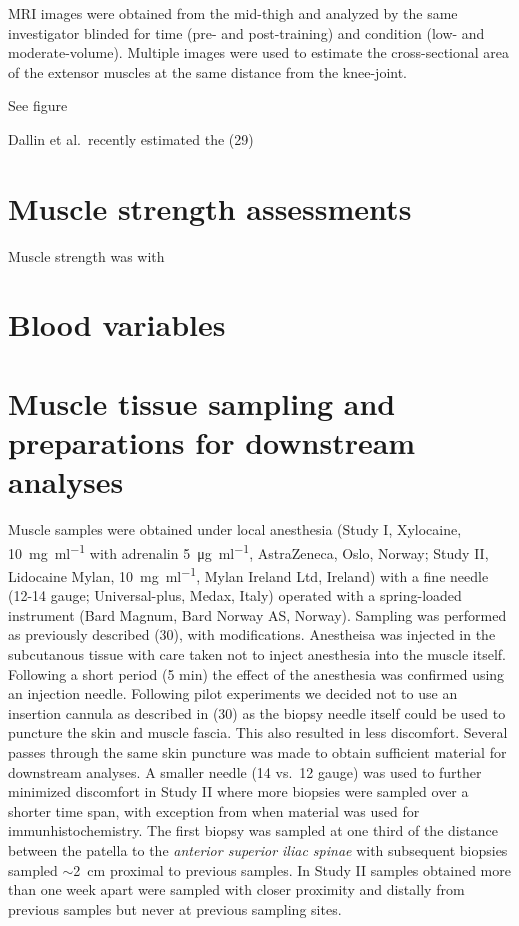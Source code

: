\documentclass[twoside,10pt]{gihclass} %
\begin{document}
MRI images were obtained from the mid-thigh and analyzed by the same investigator blinded for time (pre- and post-training) and condition (low- and moderate-volume). Multiple images were used to estimate the cross-sectional area of the extensor muscles at the same distance from the knee-joint.

See figure

Dallin et al.~recently estimated the (29)

\hypertarget{muscle-strength-assessments}{%
\section{Muscle strength assessments}\label{muscle-strength-assessments}}

Muscle strength was with

\hypertarget{blood-variables}{%
\section{Blood variables}\label{blood-variables}}

\hypertarget{muscle-tissue-sampling-and-preparations-for-downstream-analyses}{%
\section{Muscle tissue sampling and preparations for downstream analyses}\label{muscle-tissue-sampling-and-preparations-for-downstream-analyses}}

Muscle samples were obtained under local anesthesia (Study I, Xylocaine, \SI{10}{\mg\per\ml} with adrenalin \SI{5}{\micro\gram\per\ml}, AstraZeneca, Oslo, Norway; Study II, Lidocaine Mylan, \SI{10}{\mg\per\ml}, Mylan Ireland Ltd, Ireland) with a fine needle (12-14 gauge; Universal-plus, Medax, Italy) operated with a spring-loaded instrument (Bard Magnum, Bard Norway AS, Norway). Sampling was performed as previously described
(30),
with modifications. Anestheisa was injected in the subcutanous tissue with care taken not to inject anesthesia into the muscle itself. Following a short period (5 min) the effect of the anesthesia was confirmed using an injection needle. Following pilot experiments we decided not to use an insertion cannula as described in (30) as the biopsy needle itself could be used to puncture the skin and muscle fascia. This also resulted in less discomfort. Several passes through the same skin puncture was made to obtain sufficient material for downstream analyses. A smaller needle (14 vs.~12 gauge) was used to further minimized discomfort in Study II where more biopsies were sampled over a shorter time span, with exception from when material was used for immunhistochemistry. The first biopsy was sampled at one third of the distance between the patella to the \emph{anterior superior iliac spinae} with subsequent biopsies sampled \(\sim\)\SI{2}{cm} proximal to previous samples. In Study II samples obtained more than one week apart were sampled with closer proximity and distally from previous samples but never at previous sampling sites.
\end{document}
